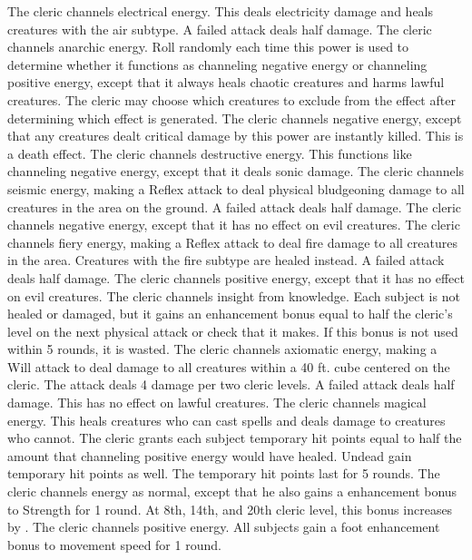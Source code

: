  The cleric channels electrical energy. This deals electricity damage and heals creatures with the air subtype. A failed attack deals half damage.
 The cleric channels anarchic energy. Roll randomly each time this power is used to determine whether it functions as channeling negative energy or channeling positive energy, except that it always heals chaotic creatures and harms lawful creatures. The cleric may choose which creatures to exclude from the effect after determining which effect is generated.
 The cleric channels negative energy, except that any creatures dealt critical damage by this power are instantly killed. This is a death effect.
 The cleric channels destructive energy. This functions like channeling negative energy, except that it deals sonic damage.
 The cleric channels seismic energy, making a Reflex attack to deal physical bludgeoning damage to all creatures in the area on the ground. A failed attack deals half damage.
 The cleric channels negative energy, except that it has no effect on evil creatures.
 The cleric channels fiery energy, making a Reflex attack to deal fire damage to all creatures in the area. Creatures with the fire subtype are healed instead. A failed attack deals half damage.
 The cleric channels positive energy, except that it has no effect on evil creatures.
 The cleric channels insight from knowledge. Each subject is not healed or damaged, but it gains an enhancement bonus equal to half the cleric's level on the next physical attack or check that it makes. If this bonus is not used within 5 rounds, it is wasted.
 The cleric channels axiomatic energy, making a Will attack to deal damage to all creatures within a 40 ft. cube centered on the cleric. The attack deals 4 damage per two cleric levels. A failed attack deals half damage. This has no effect on lawful creatures.
 The cleric channels magical energy. This heals creatures who can cast spells and deals damage to creatures who cannot.
 The cleric grants each subject temporary hit points equal to half the amount that channeling positive energy would have healed. Undead gain temporary hit points as well. The temporary hit points last for 5 rounds.
 The cleric channels energy as normal, except that he also gains a  enhancement bonus to Strength for 1 round. At 8th, 14th, and 20th cleric level, this bonus increases by . 
 The cleric channels positive energy. All subjects gain a  foot enhancement bonus to movement speed for 1 round.
